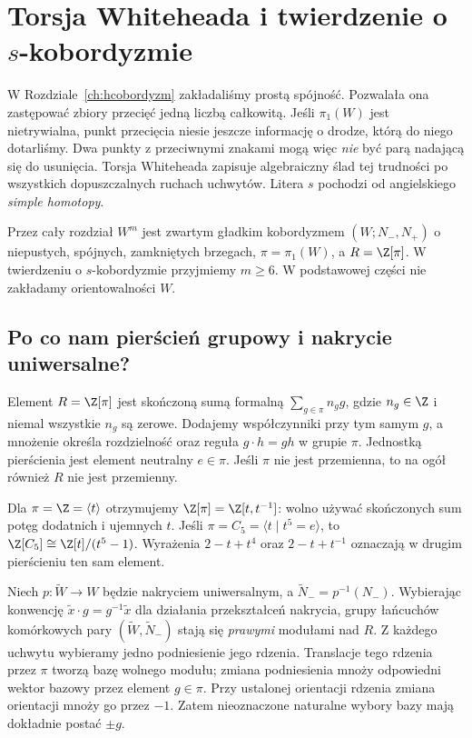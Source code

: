 \chapter{Torsja Whiteheada i twierdzenie o \texorpdfstring{$s$}{s}-kobordyzmie}
\label{ch:s-kobordyzm}

W Rozdziale~\ref{ch:hcobordyzm} zakładaliśmy prostą spójność.
Pozwalała ona zastępować zbiory przecięć jedną liczbą całkowitą.
Jeśli $\pi_1(W)$ jest nietrywialna, punkt przecięcia niesie jeszcze
informację o drodze, którą do niego dotarliśmy. Dwa punkty
z przeciwnymi znakami mogą więc \emph{nie} być parą nadającą się
do usunięcia. Torsja Whiteheada zapisuje algebraiczny ślad
tej trudności po wszystkich dopuszczalnych ruchach uchwytów.
Litera $s$ pochodzi od angielskiego \emph{simple homotopy}.

Przez cały rozdział $W^m$ jest zwartym gładkim kobordyzmem
$(W;N_-,N_+)$ o niepustych, spójnych, zamkniętych brzegach,
$\pi=\pi_1(W)$, a $R=\Z[\pi]$. W twierdzeniu o
$s$-kobordyzmie przyjmiemy $m\geq6$. W podstawowej części
nie zakładamy orientowalności $W$.

\section{Po co nam pierścień grupowy i nakrycie uniwersalne?}
\label{sec:pi-lancuchy-20}

\begin{definicja}
\label{def:pierscien-grupowy-20}
Element $R=\Z[\pi]$ jest skończoną sumą formalną
$\sum_{g\in\pi} n_g g$, gdzie $n_g\in\Z$ i niemal wszystkie
$n_g$ są zerowe. Dodajemy współczynniki przy tym samym $g$,
a mnożenie określa rozdzielność oraz reguła
$g\cdot h=gh$ w grupie $\pi$. Jednostką pierścienia jest
element neutralny $e\in\pi$. Jeśli $\pi$ nie jest przemienna,
to na ogół również $R$ nie jest przemienny.
\end{definicja}

\begin{przyklad}
Dla $\pi=\Z=\langle t\rangle$ otrzymujemy
$\Z[\pi]=\Z[t,t^{-1}]$: wolno używać skończonych sum
potęg dodatnich i ujemnych $t$. Jeśli $\pi=C_5=\langle
t\mid t^5=e\rangle$, to
$\Z[C_5]\cong\Z[t]/(t^5-1)$. Wyrażenia $2-t+t^4$ oraz
$2-t+t^{-1}$ oznaczają w drugim pierścieniu ten sam element.
\end{przyklad}

Niech $p:\widetilde W\to W$ będzie nakryciem uniwersalnym,
a $\widetilde N_-=p^{-1}(N_-)$. Wybierając konwencję
$\widetilde x\cdot g=g^{-1}\widetilde x$ dla działania
przekształceń nakrycia, grupy łańcuchów komórkowych pary
$(\widetilde W,\widetilde N_-)$ stają się \emph{prawymi}
modułami nad $R$. Z każdego uchwytu wybieramy jedno
podniesienie jego rdzenia. Translacje tego rdzenia przez $\pi$
tworzą bazę wolnego modułu; zmiana podniesienia mnoży
odpowiedni wektor bazowy przez element $g\in\pi$.
Przy ustalonej orientacji rdzenia zmiana orientacji mnoży go
przez $-1$. Zatem nieoznaczone naturalne wybory bazy
mają dokładnie postać $\pm g$.

